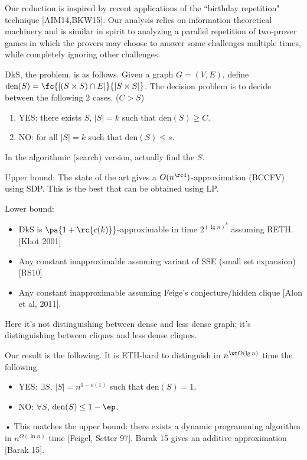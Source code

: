 Our reduction is inspired by recent applications of the ``birthday
repetition" technique [AIM14,BKW15]. Our analysis relies
on information theoretical machinery and is similar in spirit to analyzing
a parallel repetition of two-prover games in which the provers
may choose to answer some challenges multiple times, while completely
ignoring other challenges.

\begin{df}
DkS, the  problem, is as follows. Given a graph $G=(V,E)$, define 
$\text{den}(S)=\fc{|(S\times S)\cap E|}{|S\times S|}$. 
The decision problem is to decide between the following 2 cases. ($C>S$)
\begin{enumerate}
\item YES: there exists $S$, $|S|=k$ such that $\text{den}(S)\ge C$. 
\item NO: for all $|S|=k$ such that $\text{den}(S)\le s$.
\end{enumerate}
In the algorithmic (search) version, actually find the $S$.
\end{df}
Upper bound: 
The state of the art gives a $O(n^{\rc 4})$-approximation (BCCFV) using SDP. This is the best that can be obtained using LP.

Lower bound: 
\begin{itemize}
\item
DkS is $\pa{1+\rc{c(k)}}$-approximable in time $2^{(\lg n)^k}$ assuming RETH. [Khot 2001]
\item
Any constant inapproximable assuming variant of SSE (small set expansion) [RS10]
\item
Any constant inapproximable assuming Feige's conjecture/hidden clique [Alon et al, 2011].
\end{itemize}

Here it's not distinguishing between dense and less dense graph; it's distinguishing between cliques and less dense cliques.

Our result is the following. It is ETH-hard to distinguish in $n^{\wt O(\lg n)}$ time the following.
\begin{itemize}
\item
YES: $\exists S$, $|S|=n^{1-o(1)}$ such that $\text{den}(S)=1$,
\item
NO: $\forall S$, $\text{den}(S)\le 1-\ep$.
\end{itemize}•
This matches the upper bound: there exists a dynamic programming algorithm in $n^{O(\ln n)}$ time [Feigel, Setter 97]. Barak 15 gives an additive approximation [Barak 15].

